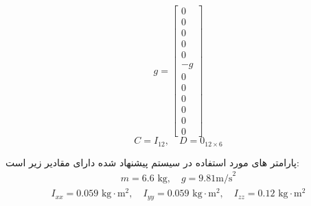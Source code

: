 \begin{equation}
	g =
	\begin{bmatrix}
		0 \\ 0 \\ 0 \\ 0 \\ 0 \\ -g \\ 0 \\ 0 \\ 0 \\ 0 \\ 0 \\ 0
	\end{bmatrix}
\end{equation}
\begin{equation}
	C = I_{12}, \quad
	D = 0_{12 \times 6}
\end{equation}


پارامتر های مورد استفاده در سیستم پیشنهاد شده دارای مقادیر زیر است:
\begin{align}
	m = 6.6 \text{ kg}, \quad g = 9.81 \text{m/s}^2
\end{align}
\begin{align}
	I_{xx} = 0.059 \text{ kg}\cdot\text{m}^2, \quad
	I_{yy} = 0.059 \text{ kg}\cdot\text{m}^2, \quad
	I_{zz} = 0.12 \text{ kg}\cdot\text{m}^2
\end{align}

